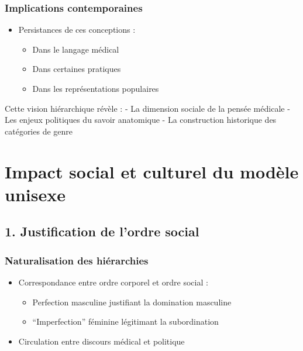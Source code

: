 \documentclass[
  letterpaper,
  DIV=11,
  numbers=noendperiod]{scrreprt}
\providecommand{\tightlist}{%
  \setlength{\itemsep}{0pt}\setlength{\parskip}{0pt}}\usepackage{longtable,booktabs,array}
\begin{document}
\subsection{Implications
contemporaines}\label{implications-contemporaines}

\begin{itemize}
\tightlist
\item
  Persistances de ces conceptions :

  \begin{itemize}
  \tightlist
  \item
    Dans le langage médical
  \item
    Dans certaines pratiques
  \item
    Dans les représentations populaires
  \end{itemize}
\end{itemize}

Cette vision hiérarchique révèle : - La dimension sociale de la pensée
médicale - Les enjeux politiques du savoir anatomique - La construction
historique des catégories de genre


\chapter{Impact social et culturel du modèle
unisexe}\label{impact-social-et-culturel-du-moduxe8le-unisexe}

\section{1. Justification de l'ordre
social}\label{justification-de-lordre-social}

\subsection{Naturalisation des
hiérarchies}\label{naturalisation-des-hiuxe9rarchies}

\begin{itemize}
\tightlist
\item
  Correspondance entre ordre corporel et ordre social :

  \begin{itemize}
  \tightlist
  \item
    Perfection masculine justifiant la domination masculine
  \item
    ``Imperfection'' féminine légitimant la subordination
  \end{itemize}
\item
  Circulation entre discours médical et politique
\end{itemize}
\end{document}
